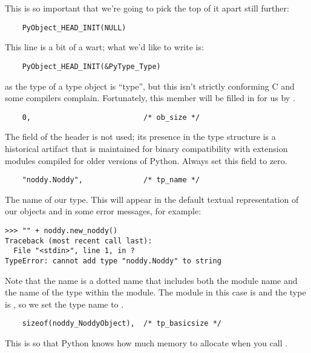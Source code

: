 This is so important that we're going to pick the top of it apart still
further:

\begin{verbatim}
    PyObject_HEAD_INIT(NULL)
\end{verbatim}

This line is a bit of a wart; what we'd like to write is:

\begin{verbatim}
    PyObject_HEAD_INIT(&PyType_Type)
\end{verbatim}

as the type of a type object is ``type'', but this isn't strictly
conforming C and some compilers complain.  Fortunately, this member
will be filled in for us by .

\begin{verbatim}
    0,                          /* ob_size */
\end{verbatim}

The  field of the header is not used; its presence in
the type structure is a historical artifact that is maintained for
binary compatibility with extension modules compiled for older
versions of Python.  Always set this field to zero.

\begin{verbatim}
    "noddy.Noddy",              /* tp_name */
\end{verbatim}

The name of our type.  This will appear in the default textual
representation of our objects and in some error messages, for example:

\begin{verbatim}
>>> "" + noddy.new_noddy()
Traceback (most recent call last):
  File "<stdin>", line 1, in ?
TypeError: cannot add type "noddy.Noddy" to string
\end{verbatim}

Note that the name is a dotted name that includes both the module name
and the name of the type within the module. The module in this case is
 and the type is , so we set the type name
to .

\begin{verbatim}
    sizeof(noddy_NoddyObject),  /* tp_basicsize */
\end{verbatim}

This is so that Python knows how much memory to allocate when you call
.

